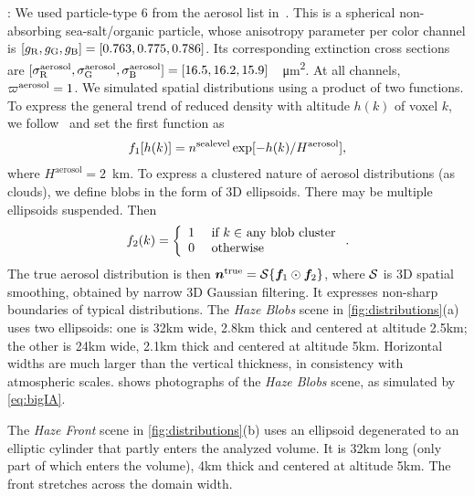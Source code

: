 \documentclass[10pt,letterpaper]{article}
\begin{document}
: We used particle-type 6 from the aerosol list
in~\cite{Martonchik2009}. This is a spherical non-absorbing
sea-salt/organic particle, whose anisotropy parameter per color
channel is $[g_{\rm R},g_{\rm G},g_{\rm B}]=[0.763,0.775,0.786]$. Its
corresponding extinction cross sections are $[\sigma^{\rm
  aerosol}_{\rm R}, \sigma^{\rm aerosol}_{\rm G}, \sigma^{\rm
  aerosol}_{\rm
  B}]=[16.5,16.2,15.9]$~\si[sticky-per]{\per\micro\meter\squared}.  At
all channels, $\varpi^{\rm aerosol}=1$. We simulated spatial
distributions using a product of two functions. To express the general
trend of reduced density with altitude $h(k)$ of voxel $k$, we
follow~\cite{Levi1980} and set the first function as
\begin{align}
  f_1[h(k)] = n^{\rm sealevel}
  \exp[-h(k)/H^\mathrm{aerosol}],
\end{align}
where $H^\mathrm{aerosol}=2$~\si{\km}. To express a clustered nature
of aerosol distributions (as clouds), we define blobs in the form of
3D ellipsoids. There may be multiple ellipsoids suspended.  Then
\begin{equation}
  f_2(k) =
  \left\{
    \begin{array}{ll}
      1  & \mbox{ if $k\in$ any blob cluster} \\
      0  & \mbox{ otherwise}
      \label{eq:f2}
    \end{array}
  \right.
  .
  \hspace{-0.05cm}
\end{equation}
The true aerosol distribution is then ${\bm n}^{\rm true}={\cal
  S}\{{\bm f}_1\odot {\bm f}_2\}$, where ${\cal S}$ is 3D spatial
smoothing, obtained by narrow 3D Gaussian filtering. It expresses
non-sharp boundaries of typical distributions. The {\em Haze Blobs}
scene in \cref{fig:distributions}(a) uses two ellipsoids: one is 32km
wide, 2.8km thick and centered at altitude 2.5km; the other is 24km
wide, 2.1km thick and centered at altitude 5km. Horizontal widths
are much larger than the vertical thickness, in consistency with
atmospheric scales.  shows
photographs of the {\em Haze Blobs} scene, as simulated by
\cref{eq:bigIA}. 


The {\em Haze Front} scene in \cref{fig:distributions}(b) uses an
ellipsoid degenerated to an elliptic cylinder that partly enters the
analyzed volume. It is 32km long (only part of which enters the
volume), 4km thick and centered at altitude 5km. The front stretches
across the domain width.
\end{document}
